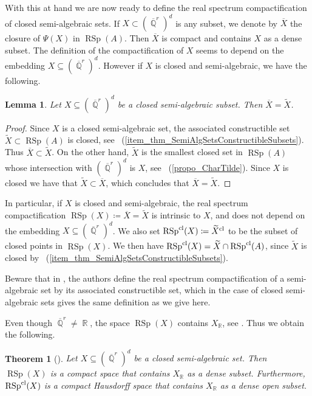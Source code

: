 \documentclass{amsart}
\theoremstyle{plain}
\newtheorem{theorem}[proposition]{Theorem}
\newtheorem{lemma}[proposition]{Lemma}
\theoremstyle{definition}
\DeclareMathOperator{\rsp}{RSp}
\DeclareMathOperator{\RSp}{RSp}
\DeclareMathOperator{\Rb}{{\mathbb{R}}}
\DeclareMathOperator{\Qb}{\mathbb{Q}}
\newcommand{\cl}{\textnormal{cl}}
\newcommand{\Qbar}{\overline{\Qb}^r}
\newcommand{\1}{\mathbf{1}}
\begin{document}
With this at hand we are now ready to define the real spectrum compactification of closed semi-algebraic sets.
If $X \subset (\overline{\Qb}^r)^d$ is any subset, we denote by $\overline{X}$ the closure of $\Psi(X)$ in $\RSp(A)$.
Then $\overline{X}$ is compact and contains $X$ as a dense subset.
The definition of the compactification of $X$ seems to depend on the embedding $X \subseteq (\overline{\Qb}^r)^d$.
However if $X$ is closed and semi-algebraic, we have the following.

\begin{lemma}
    Let $X \subseteq (\overline{\Qb}^r)^d$ be a closed semi-algebraic subset.
    Then $\overline{X}=\widetilde{X}$.
\end{lemma}
\begin{proof}
    Since $X$ is a closed semi-algebraic set, the associated constructible set $\widetilde{X} \subset \RSp(A)$ is closed, see ~(\ref{item_thm_SemiAlgSetsConstructibleSubsets}).
    Thus $\overline{X}\subset \widetilde{X}$.
    On the other hand, $\widetilde{X}$ is the smallest closed set in $\RSp(A)$ whose intersection with $(\overline{\Qb}^r)^d$ is $X$, see ~(\ref{propo_CharTilde}).
    Since $X$ is closed we have that $\widetilde{X} \subset \overline{X}$, which concludes that $\overline{X}=\widetilde{X}$.
\end{proof}

In particular, if $X$ is closed and semi-algebraic, the real spectrum compactification $\rsp(X) \coloneqq \overline{X}=\widetilde{X}$ is intrinsic to $X$, and does not depend on the embedding $X \subseteq (\overline{\Qb}^r)^d$.
We also set $\rsp^\cl(X) \coloneqq \widetilde{X}^\cl $ to be the subset of closed points in $\rsp(X)$.
We then have $\rsp^\cl(X)  = \widetilde{X} \cap \rsp^\cl(A)$, since $\widetilde{X}$ is closed by ~(\ref{item_thm_SemiAlgSetsConstructibleSubsets}).

Beware that in \cite[\S 2.7]{BurgerIozziParreauPozzetti_RSCCharacterVarieties2}, the authors define the real spectrum compactification of a semi-algebraic set by its associated constructible set, which in the case of closed semi-algebraic sets gives the same definition as we give here.

Even though $\overline{\Qb}^r \neq \Rb$, the space $\rsp(X)$ contains $X_{\Rb}$, see .
Thus we obtain the following.

\begin{theorem}[{\cite{BurgerIozziParreauPozzetti_RSCCharacterVarieties2}}]
    Let $X \subseteq (\Qbar)^d$ be a closed semi-algebraic set.
    Then $\rsp(X)$ is a compact space that contains $X_{\Rb}$ as a dense subset.
    Furthermore, $\rsp^\cl(X)$ is a compact Hausdorff space that contains $X_{\Rb}$ as a dense open subset.
\end{theorem}
\end{document}
